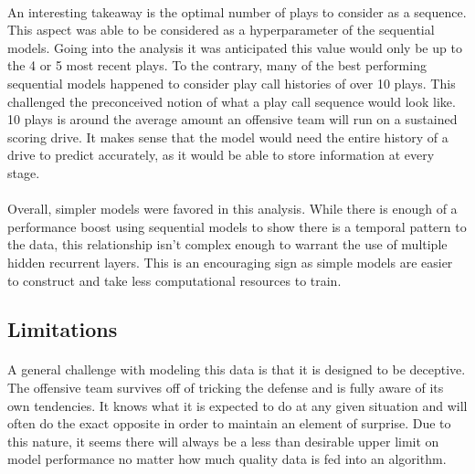 \documentclass[11pt]{article}
\begin{document}
\begin{multicols*}{2}
            \vspace{-10pt}
            \paragraph{}
                An interesting takeaway is the optimal number of plays to consider as a sequence. 
                This aspect was able to be considered as a hyperparameter of the sequential models. 
                Going into the analysis it was anticipated this value would only be up to the 4 or 5 most recent plays.
                To the contrary, many of the best performing sequential models happened to consider play call histories of over 10 plays. 
                This challenged the preconceived notion of what a play call sequence would look like. 
                10 plays is around the average amount an offensive team will run on a sustained scoring drive. 
                It makes sense that the model would need the entire history of a drive to predict accurately, as it would be able to store information at every stage. 


            \vspace{-10pt}
            \paragraph{}
                Overall, simpler models were favored in this analysis.
                While there is enough of a performance boost using sequential models to show there is a temporal pattern to the data, this relationship isn't complex enough to warrant the use of multiple hidden recurrent layers.
                This is an encouraging sign as simple models are easier to construct and take less computational resources to train.
        

        \subsection{Limitations}
            \paragraph{}
                A general challenge with modeling this data is that it is designed to be deceptive. 
                The offensive team survives off of tricking the defense and is fully aware of its own tendencies. 
                It knows what it is expected to do at any given situation and will often do the exact opposite in order to maintain an element of surprise. 
                Due to this nature, it seems there will always be a less than desirable upper limit on model performance no matter how much quality data is fed into an algorithm.


\end{multicols*}
\end{document}
